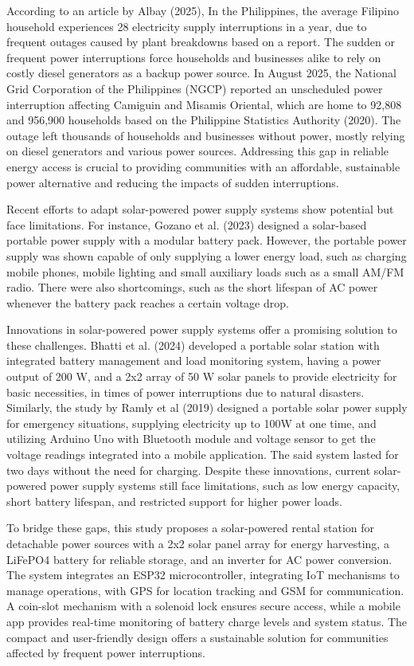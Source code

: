 { According to an article by Albay (2025), In the Philippines, the average Filipino household experiences 28 electricity supply interruptions in a year, due to frequent outages caused by plant breakdowns based on a report. The sudden or frequent power interruptions force households and businesses alike to rely on costly diesel generators as a backup power source. In August  2025, the National Grid Corporation of the Philippines (NGCP) reported an unscheduled power interruption affecting Camiguin and Misamis Oriental, which are home to 92,808 and 956,900 households based on the Philippine Statistics Authority (2020). The outage left thousands of households and businesses without power, mostly relying on diesel generators and various power sources. Addressing this gap in reliable energy access is crucial to providing communities with an affordable, sustainable power alternative and reducing the impacts of sudden interruptions. 

 Recent efforts to adapt solar-powered power supply systems show potential but face limitations. For instance, Gozano et al. (2023) designed a solar-based portable power supply with a modular battery pack. However, the portable power supply was shown capable of only supplying a lower energy load, such as charging mobile phones, mobile lighting and small auxiliary loads such as a small AM/FM radio. There were also shortcomings, such as the short lifespan of AC power whenever the battery pack reaches a certain voltage drop. 
 
 Innovations in solar-powered power supply systems offer a promising solution to these challenges. Bhatti et al. (2024) developed a portable solar station with integrated battery management and load monitoring system, having a power output of 200 W, and a 2x2 array of 50 W solar panels to provide electricity for basic necessities, in times of power interruptions due to natural disasters. Similarly,  the study by Ramly et al (2019) designed a portable solar power supply for emergency situations, supplying electricity up to 100W at one time, and utilizing Arduino Uno with Bluetooth module and voltage sensor to get the voltage readings integrated into a mobile application.  The said system lasted for two days without the need for charging. Despite these innovations, current solar-powered power supply systems still face limitations, such as low energy capacity, short battery lifespan, and restricted support for higher power loads.
 
 To bridge these gaps, this study proposes a solar-powered rental station for detachable power sources with a 2x2 solar panel array for energy harvesting, a LiFePO4 battery for reliable storage, and an inverter for AC power conversion. The system integrates an ESP32 microcontroller, integrating IoT mechanisms to manage operations, with GPS for location tracking and GSM for communication. A coin-slot mechanism with a solenoid lock ensures secure access, while a mobile app provides real-time monitoring of battery charge levels and system status. The compact and user-friendly design offers a sustainable solution for communities affected by frequent power interruptions.


}

